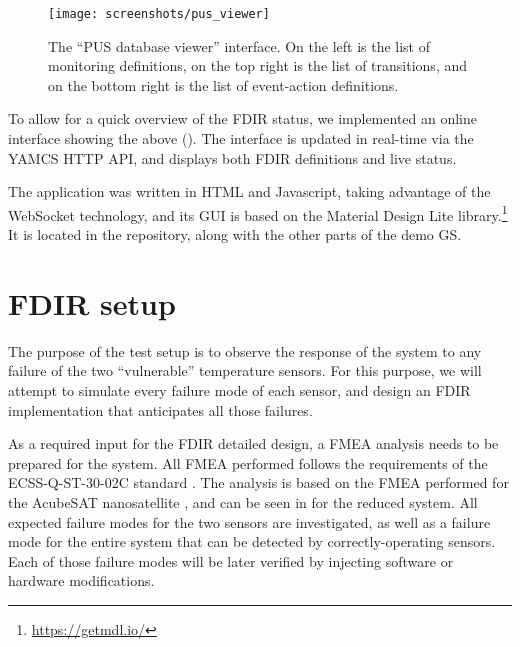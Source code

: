 \documentclass[a4paper,nobib]{tufte-book}
\begin{document}
\begin{figure}[h]
	\texttt{[image: screenshots/pus\_viewer]}
	\caption[The ``PUS database viewer'' interface]{The ``\acs{PUS} database viewer'' interface. On the left is the list of monitoring definitions, on the top right is the list of transitions, and on the bottom right is the list of event-action definitions.}
		\label{fig:pusviewer}
\end{figure}
	
To allow for a quick overview of the \acs{FDIR} status, we implemented an online interface showing the above (). The interface is updated in real-time via the \acs{YAMCS} \acs{HTTP} \acs{API}, and displays both \acs{FDIR} definitions and live status.

The application was written in HTML and Javascript, taking advantage of the WebSocket technology, and its GUI is based on the Material Design Lite library.\footnote[]{\url{https://getmdl.io/}} It is located in the repository, along with the other parts of the demo \acl{GS}.

\section{\ac{FDIR} setup}

The purpose of the test setup is to observe the response of the system to any failure of the two ``vulnerable'' temperature sensors. For this purpose, we will attempt to simulate every failure mode of each sensor, and design an \ac{FDIR} implementation that anticipates all those failures.

As a required input for the \ac{FDIR} detailed design, a \ac{FMEA} analysis needs to be prepared for the system. All \ac{FMEA} performed follows the requirements of the ECSS-Q-ST-30-02C standard \autocite{ECSS-Q-ST-30-02C}. The analysis is based on the \ac{FMEA} performed for the AcubeSAT nanosatellite \autocite{retselis_acubesat_fmea_2020}, and can be seen in  for the reduced system. All expected failure modes for the two sensors are investigated, as well as a failure mode for the entire system that can be detected by correctly-operating sensors. Each of those failure modes will be later verified by injecting software or hardware modifications.
\end{document}
